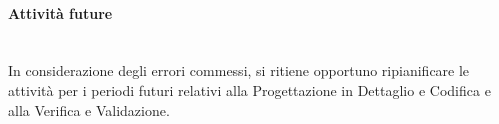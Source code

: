 \paragraph{Attività future}\mbox{}\\
In considerazione degli errori commessi, si ritiene opportuno ripianificare le attività per i periodi futuri 
relativi alla Progettazione in Dettaglio e Codifica e alla Verifica e Validazione. 


%
